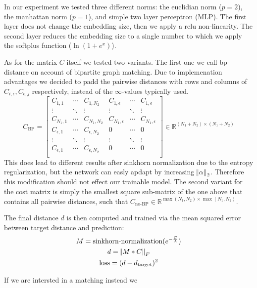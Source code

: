 In our experiment we tested three different norms: the euclidian norm ($p=2$), the manhattan norm ($p=1$), and simple two layer perceptron (MLP). The first layer does not change the embedding size, then we apply a relu non-linearity. The second layer reduces the embedding size to a single number to which we apply the softplus function ($\ln(1 + e^x)$).

As for the matrix $C$ itself we tested two variants. The first one we call bp-distance on account of bipartite graph matching. Due to implemenation advantages we decided to padd the pairwise distances with rows and columns of $C_{i, \epsilon}, C_{\epsilon, j}$ respectively, instead of the $\infty$-values typically used.
\begin{equation}
     C_\text{BP}=
          \left[
          \begin{array}{ccc|ccc}
               C_{1,1} & \dotsi & C_{1, N_2} & C_{1, \epsilon} & \dotsi & C_{1, \epsilon} \\
               \vdots & \ddots & \vdots & \vdots & \ddots & \vdots \\
               C_{N_1, 1} & \dotsi & C_{N_1, N_2} & C_{N_1, \epsilon} & \dotsi & C_{N_1, \epsilon} \\
               \hline
               C_{\epsilon, 1} & \dotsi & C_{\epsilon, N_2} & 0 & \dotsi & 0 \\
               \vdots & \ddots & \vdots & \vdots & \ddots & \vdots \\
               C_{\epsilon, 1} & \dotsi & C_{\epsilon, N_2} & 0 & \dotsi & 0 \\
          \end{array}
          \right]
     \in \mathbb{R}^{(N_1 + N_2) \times (N_1 + N_2)}
\end{equation}
This does lead to different results after sinkhorn normalization due to the entropy regularization, but the network can easly apdapt by increasing $\norm{\alpha}_2$. Therefore this modification should not effect our trainable model. The second variant for the cost matrix is simply the smallest square sub-matrix of the one above that contains all pairwise distances, such that $C_\text{no-BP} \in \mathbb{R}^{\max({N_1, N_2}) \times \max({N_1, N_2})}$.

The final distance $d$ is then computed and trained via the mean squared error between target distance and prediction:
\begin{equation}
     \begin{gathered}
          M = \text{sinkhorn-normalization}(e^{-\frac{C}{\lambda}}) \\
          d = \norm{M * C}_F \\
          \text{loss} = (d - d_\text{target})^2
     \end{gathered}
\end{equation}

If we are intersted in a matching instead we %

